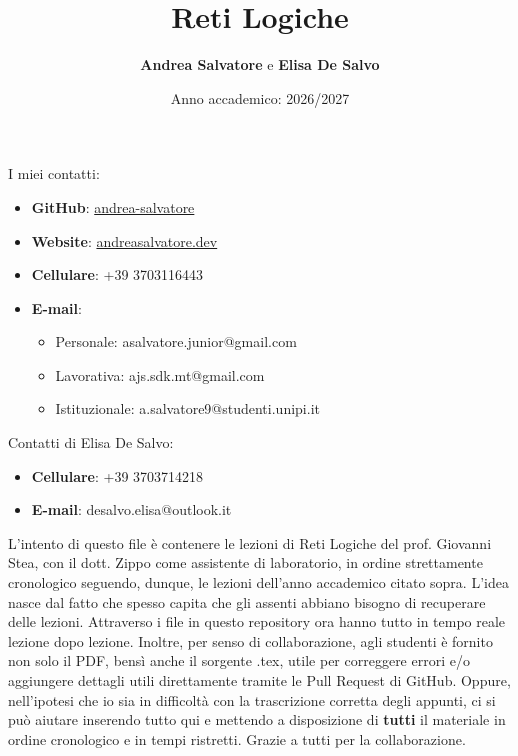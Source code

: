 \documentclass[11pt,a4paper]{article}
\begin{document}
	\title{\textbf{Reti Logiche}}
	\author{\textbf{Andrea Salvatore} e \textbf{Elisa De Salvo}}
	\date{Anno accademico: 2026/2027}
	\maketitle

	\begin{minipage}[t]{0.56\textwidth}
	I miei contatti:
	\begin{itemize}
		\item \textbf{GitHub}: \href{https://github.com/andrea-salvatore}{andrea-salvatore}
		\item \textbf{Website}: \href{https://andreasalvatore.dev/}{andreasalvatore.dev}
		\item \textbf{Cellulare}: +39 3703116443
		\item \textbf{E-mail}:
		\begin{itemize}
			\item Personale: asalvatore.junior@gmail.com
			\item Lavorativa: ajs.sdk.mt@gmail.com
			\item Istituzionale: a.salvatore9@studenti.unipi.it
		\end{itemize}
	\end{itemize}
	\end{minipage}\hfill
	\begin{minipage}[t]{0.42\textwidth}
	Contatti di Elisa De Salvo:
	\begin{itemize}
		\item \textbf{Cellulare}: +39 3703714218
		\item \textbf{E-mail}: desalvo.elisa@outlook.it
	\end{itemize}
	\end{minipage}
	\vspace{1cm}

	L'intento di questo file è contenere le lezioni di Reti Logiche del prof. Giovanni Stea, con il dott. Zippo come assistente di laboratorio, in ordine strettamente cronologico seguendo, dunque, le lezioni dell'anno accademico citato sopra. L'idea nasce dal fatto che spesso capita che gli assenti abbiano bisogno di recuperare delle lezioni. Attraverso i file in questo repository ora hanno tutto in tempo reale lezione dopo lezione. Inoltre, per senso di collaborazione, agli studenti è fornito non solo il PDF, bensì anche il sorgente .tex, utile per correggere errori e/o aggiungere dettagli utili direttamente tramite le Pull Request di GitHub. Oppure, nell'ipotesi che io sia in difficoltà con la trascrizione corretta degli appunti, ci si può aiutare inserendo tutto qui e mettendo a disposizione di \textbf{tutti} il materiale in ordine cronologico e in tempi ristretti. Grazie a tutti per la collaborazione.
\end{document}
